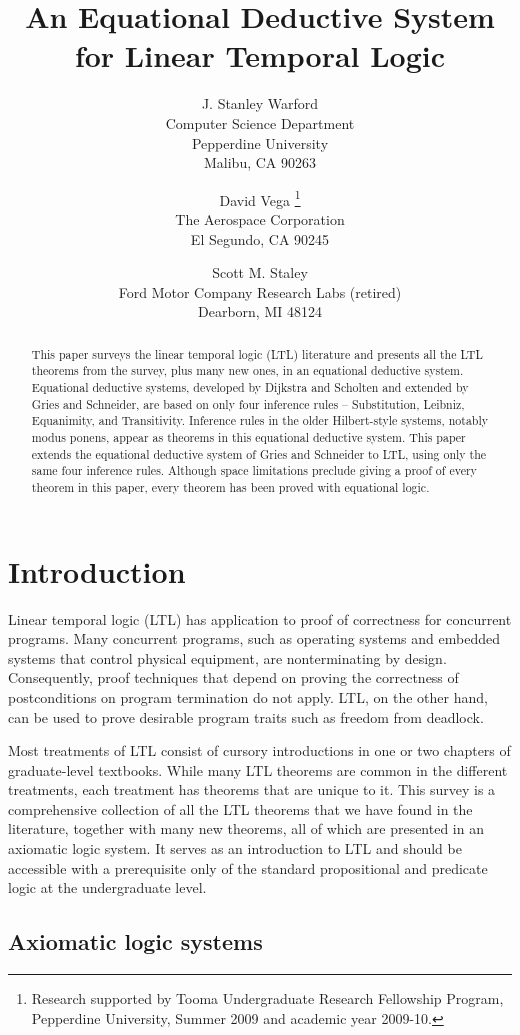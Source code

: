 \documentclass[12pt, fleqn, leqno]{article}
\title{An Equational Deductive System\\for Linear Temporal Logic \opt{complete}{(Complete)}}
\author{
   J. Stanley Warford\\
   Computer Science Department\\
   Pepperdine University\\
   Malibu, CA 90263
   \and
   David Vega
   \thanks{Research supported by Tooma Undergraduate Research Fellowship Program,
   Pepperdine University,
   Summer 2009 and academic year 2009-10.}\\
   The Aerospace Corporation\\
   El Segundo, CA 90245
   \and
   Scott M. Staley\\
   Ford Motor Company Research Labs (retired)\\
   Dearborn, MI 48124}
\date{} %
\begin{document}
\maketitle
\begin{abstract}
This paper surveys the linear temporal logic (LTL) literature and presents all the LTL theorems from the survey, plus many new ones, in an equational deductive system.
Equational deductive systems, developed by Dijkstra and Scholten and extended by Gries and Schneider, are based on only four inference rules -- Substitution, Leibniz, Equanimity, and Transitivity.
Inference rules in the older Hilbert-style systems, notably modus ponens, appear as theorems in this equational deductive system.
This paper extends the equational deductive system of Gries and Schneider to LTL, using only the same four inference rules.
Although space limitations preclude giving a proof of every theorem in this paper, every theorem has been proved with equational logic.
\end{abstract}

\thispagestyle{plain}

\section{Introduction}

Linear temporal logic (LTL) has application to proof of correctness for concurrent programs.
Many concurrent programs, such as operating systems and embedded systems that control physical equipment, are nonterminating by design. 
Consequently, proof techniques that depend on proving the correctness of postconditions on program termination do not apply.
LTL, on the other hand, can be used to prove desirable program traits such as freedom from deadlock.

Most treatments of LTL consist of cursory introductions in one or two chapters of graduate-level textbooks. \cite{Baier, Kroger, Manna, Schn}
While many LTL theorems are common in the different treatments, each treatment has theorems that are unique to it.
This survey is a comprehensive collection of all the LTL theorems that we have found in the literature, together with many new theorems, all of which are presented in an axiomatic logic system.
It serves as an introduction to LTL and should be accessible with a prerequisite only of the standard propositional and predicate logic at the undergraduate level.

\subsection{Axiomatic logic systems}
\end{document}
